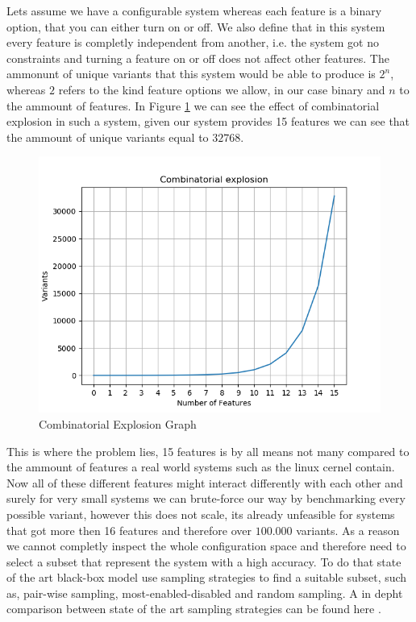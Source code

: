 Lets assume we have a configurable system whereas each feature is a binary option, that you can either turn on or off. We also define 
that in this system every feature is completly independent from another, i.e. the system got no constraints and turning a feature on or off
does not affect other features. The ammonunt of unique variants that this system would be able to produce is $2^n$, whereas $2$ refers to
the kind feature options we allow, in our case binary and $n$ to the ammount of features. In Figure \ref{fig:Combinatorial-Explosion-Graph}
we can see the effect of combinatorial explosion in such a system, given our system provides 15 features we can see that the ammount of 
unique variants equal to $32768$. 

\begin{figure}[h]
    \centering
    \includegraphics[scale=0.6]{gfx/Combinatorial_explosion_graph.png}
    \caption{Combinatorial Explosion Graph}
    \label{fig:Combinatorial-Explosion-Graph}
\end{figure}

This is where the problem lies, 15 features is by all means not many compared to the ammount of features a real world systems such as the
linux cernel contain. Now all of these different features might interact differently with each other and surely for very small systems
we can brute-force our way by benchmarking every possible variant, however this does not scale, its already unfeasible for systems that
got more then 16 features and therefore over $100.000$ variants. As a reason we cannot completly inspect the whole configuration space and
therefore need to select a subset that represent the system with a high accuracy. To do that state of the art black-box model use sampling
strategies to find a suitable subset, such as, pair-wise sampling, most-enabled-disabled and random sampling. A in depht comparison
between state of the art sampling strategies can be found here \cite{sampling-strategies}.

